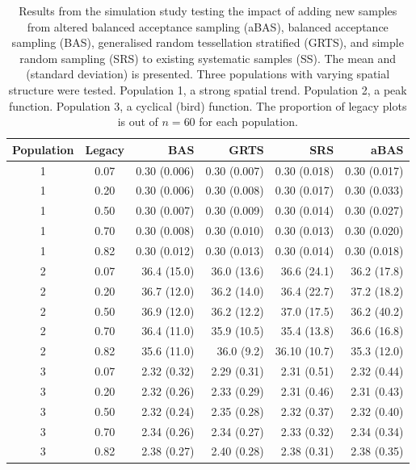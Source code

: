 \documentclass[titlepage]{article}
\begin{document}
\begin{table}[H]
	\caption{Results from the simulation study testing the impact of adding new samples from altered balanced acceptance sampling (aBAS), balanced acceptance sampling (BAS), generalised random tessellation stratified (GRTS), and simple random sampling (SRS) to existing systematic samples (SS). The mean and (standard deviation) is presented. Three populations with varying spatial structure were tested. Population 1, a strong spatial trend. Population 2, a peak function. Population 3, a cyclical (bird) function. The proportion of legacy plots is out of $n = 60$ for each population.}
	\label{simss}
	\begin{tabular}{ccrrrr}
		\hline
		Population & Legacy & BAS & GRTS & SRS & aBAS \\ 
		\hline
		1 & 0.07 & 0.30 (0.006) & 0.30 (0.007) & 0.30 (0.018) & 0.30 (0.017) \\ 
		1 & 0.20 & 0.30 (0.006) & 0.30 (0.008) & 0.30 (0.017) & 0.30 (0.033) \\ 
		1 & 0.50 & 0.30 (0.007) & 0.30 (0.009) & 0.30 (0.014) & 0.30 (0.027) \\ 
		1 & 0.70 & 0.30 (0.008) & 0.30 (0.010) & 0.30 (0.013) & 0.30 (0.020) \\ 
		1 & 0.82 & 0.30 (0.012) & 0.30 (0.013) & 0.30 (0.014) & 0.30 (0.018) \\ 
		2 & 0.07 & 36.4 (15.0) & 36.0 (13.6) & 36.6 (24.1) & 36.2 (17.8) \\ 
		2 & 0.20 & 36.7 (12.0) & 36.2 (14.0) & 36.4 (22.7) & 37.2 (18.2) \\ 
		2 & 0.50 & 36.9 (12.0) & 36.2 (12.2) & 37.0 (17.5) & 36.2 (40.2) \\ 
		2 & 0.70 & 36.4 (11.0) & 35.9 (10.5) & 35.4 (13.8) & 36.6 (16.8) \\ 
		2 & 0.82 & 35.6 (11.0) & 36.0 (9.2) & 36.10 (10.7) & 35.3 (12.0) \\ 
		3 & 0.07 & 2.32 (0.32) & 2.29 (0.31) & 2.31 (0.51) & 2.32 (0.44) \\ 
		3 & 0.20 & 2.32 (0.26) & 2.33 (0.29) & 2.31 (0.46) & 2.31 (0.43) \\ 
		3 & 0.50 & 2.32 (0.24) & 2.35 (0.28) & 2.32 (0.37) & 2.32 (0.40) \\ 
		3 & 0.70 & 2.34 (0.26) & 2.34 (0.27) & 2.33 (0.32) & 2.34 (0.34) \\ 
		3 & 0.82 & 2.38 (0.27) & 2.40 (0.28) & 2.38 (0.31) & 2.38 (0.35) \\ 
		\hline
	\end{tabular}

\end{table}
\end{document}
